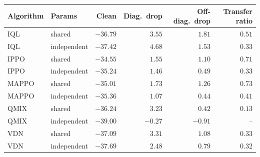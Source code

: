 \begin{tabular}{llrrrr}
\toprule
Algorithm & Params & Clean & Diag.\ drop & Off-diag.\ drop & Transfer ratio \\
\midrule
IQL & shared & $-36.79$ & $3.55$ & $1.81$ & $0.51$ \\
IQL & independent & $-37.42$ & $4.68$ & $1.53$ & $0.33$ \\
\midrule
IPPO & shared & $-34.55$ & $1.55$ & $1.10$ & $0.71$ \\
IPPO & independent & $-35.24$ & $1.46$ & $0.49$ & $0.33$ \\
\midrule
MAPPO & shared & $-35.01$ & $1.73$ & $1.26$ & $0.73$ \\
MAPPO & independent & $-35.36$ & $1.07$ & $0.44$ & $0.41$ \\
\midrule
QMIX & shared & $-36.24$ & $3.23$ & $0.42$ & $0.13$ \\
QMIX & independent & $-39.00$ & $-0.27$ & $-0.91$ & -- \\
\midrule
VDN & shared & $-37.09$ & $3.31$ & $1.08$ & $0.33$ \\
VDN & independent & $-37.69$ & $2.48$ & $0.79$ & $0.32$ \\
\bottomrule
\end{tabular}